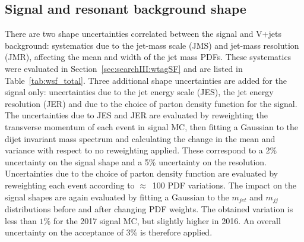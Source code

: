 \subsection{Signal and resonant background shape}
There are two shape uncertainties correlated between the signal and V+jets background: systematics due to the jet-mass scale (JMS) and jet-mass resolution (JMR), affecting the mean and width of the jet mass PDFs. These systematics were evaluated in Section~\ref{sec:searchIII:wtagSF} and are listed in Table~\ref{tab:wsf_total}. 
Three additional shape uncertainties are added for the signal only: uncertainties due to the jet energy scale (JES), the jet energy resolution (JER) and due to the choice of parton density function for the signal. The uncertainties due to JES and JER are evaluated by reweighting the transverse momentum of each event in signal MC, then fitting a Gaussian to the dijet invariant mass spectrum and calculating the change in the mean and variance with respect to no reweighting applied. These correspond to a 2\% uncertainty on the signal \MVV shape and a 5\% uncertainty on the \MVV resolution.\newline
Uncertainties due to the choice of parton density function are evaluated by reweighting each event according to $\approx$~100 PDF variations. The impact on the signal shapes are again evaluated by fitting a Gaussian to the $m_{jet}$ and $m_{jj}$ distributions before and after changing PDF weights. The obtained variation is less than $1\%$ for the 2017 signal MC, but slightly higher in 2016. An overall uncertainty on the acceptance of 3\% is therefore applied. 


